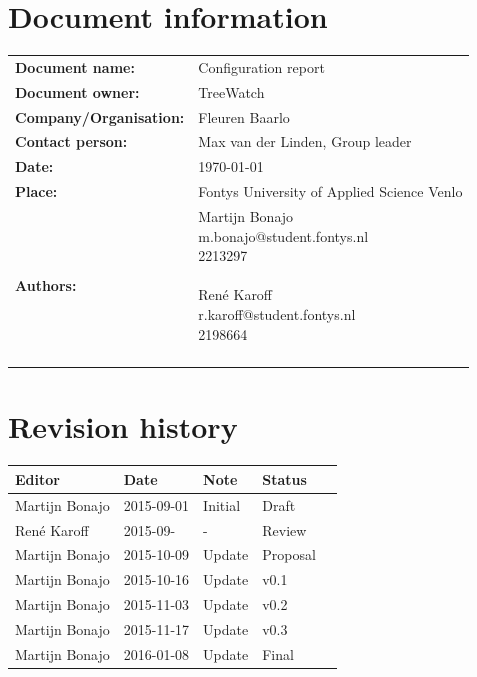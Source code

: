 \documentclass[12pt]{article}
\begin{document}
	 \section*{Document information}
	\begin{tabular}{ll}
		\textbf{Document name:} & Configuration report\\
		\textbf{Document owner:} & TreeWatch \\
		\textbf{Company/Organisation:} & Fleuren Baarlo \\
		\textbf{Contact person:} & Max van der Linden, Group leader \\
		\textbf{Date:} & \today \\
		\textbf{Place:} & Fontys University of Applied Science Venlo \\
		\textbf{Authors:} & \parbox[t]{5cm}{
		Martijn Bonajo\\ m.bonajo@student.fontys.nl\\ 2213297 \\ \\
		René Karoff\\ r.karoff@student.fontys.nl\\ 2198664 \\ \\ }
	\end{tabular}


	\section*{Revision history}

	\begin{table}[htbp]
		\begin{tabular}{ p{}  p{3cm}  p{1,5cm}  p{}  p{} }
			\textbf{Editor} & \textbf{Date} & \textbf{Note} & \textbf{Status} \\ \hline
			Martijn Bonajo & 2015-09-01 & Initial & Draft \\
			René Karoff & 2015-09- & - & Review \\
			Martijn Bonajo & 2015-10-09 & Update & Proposal \\
			Martijn Bonajo & 2015-10-16 & Update & v0.1 \\
			Martijn Bonajo & 2015-11-03 & Update & v0.2 \\
			Martijn Bonajo & 2015-11-17 & Update & v0.3 \\
			Martijn Bonajo & 2016-01-08 & Update & Final \\
		\end{tabular}
	\end{table}
	
\end{document}

